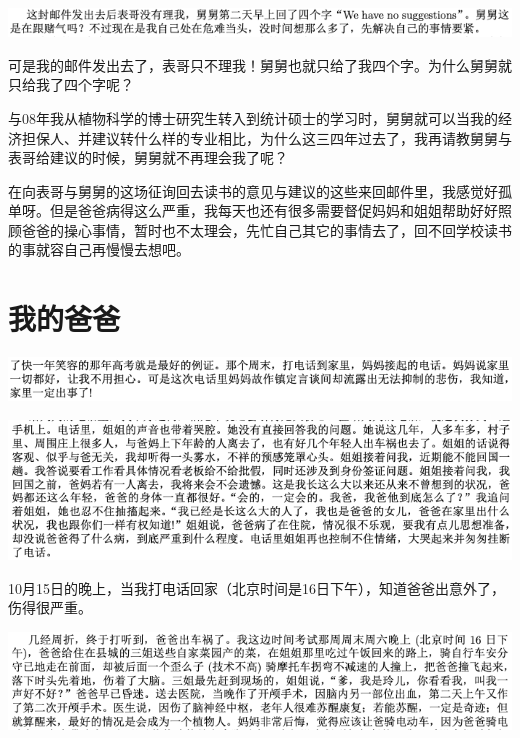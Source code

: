 \documentclass[9pt, b5paper]{article}
\begin{document}
\begin{center}
\includegraphics[width=.9\linewidth]{./pic/backups_plans_20210414_161140.png}
\end{center}

可是我的邮件发出去了，表哥只不理我！舅舅也就只给了我四个字。为什么舅舅就只给我了四个字呢？

与08年我从植物科学的博士研究生转入到统计硕士的学习时，舅舅就可以当我的经济担保人、并建议转什么样的专业相比，为什么这三四年过去了，我再请教舅舅与表哥给建议的时候，舅舅就不再理会我了呢？

在向表哥与舅舅的这场征询回去读书的意见与建议的这些来回邮件里，我感觉好孤单呀。但是爸爸病得这么严重，我每天也还有很多需要督促妈妈和姐姐帮助好好照顾爸爸的操心事情，暂时也不太理会，先忙自己其它的事情去了，回不回学校读书的事就容自己再慢慢去想吧。

\section{我的爸爸}
\label{sec:orgd5c0d5b}

\begin{center}
\includegraphics[width=.9\linewidth]{./pic/backups_plans_20210416_155038.png}
\end{center}

\begin{center}
\includegraphics[width=.9\linewidth]{./pic/backups_plans_20210416_155131.png}
\end{center}

10月15日的晚上，当我打电话回家（北京时间是16日下午），知道爸爸出意外了，伤得很严重。

\begin{center}
\includegraphics[width=.9\linewidth]{./pic/backups_plans_20210414_193202.png}
\end{center}
\end{document}
